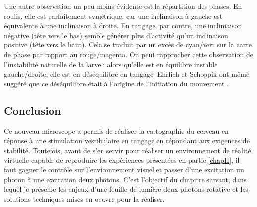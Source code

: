 Une autre observation un peu moins évidente est la répartition des phases. En roulis, elle est parfaitement symétrique, car une inclinaison à gauche est équivalente à une inclinaison à droite. En tangage, par contre, une incliniaison négative (tête vers le bas) semble générer plus d'activité qu'un inclinaison positive (tête vers le haut). Cela se traduit par un excès de cyan/vert sur la carte de phase par rapport au rouge/magenta. On peut rapprocher cette observation de l'instabilité naturelle de la larve : alors qu'elle est en équilibre instable gauche/droite, elle est en déséquilibre en tangage. Ehrlich et Schoppik ont même suggéré que ce déséquilibre était à l'origine de l'initiation du mouvement \cite{ehrlich_control_2017}.

\subsection{Conclusion}

Ce nouveau microscope a permis de réaliser la cartographie du cerveau en réponse à une stimulation vestibulaire en tangage en répondant aux exigences de stabilité. Toutefois, avant de s'en servir pour réaliser un environnement de réalité virtuelle capable de reproduire les expériences présentées en partie \ref{chapII}, il faut gagner le contrôle sur l'environnement visuel et passer d'une excitation un photon à une excitation deux photons. C'est l'objectif du chapitre suivant, dans lequel je présente les enjeux d'une feuille de lumière deux photons rotative et les solutions techniques mises en oeuvre pour la réaliser.